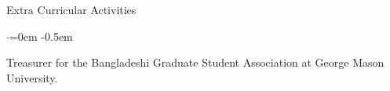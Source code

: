 \documentclass{resume} %
\renewenvironment{rSubsection}[4]{%
 {\bf #1} \hfill {#2}%
 \ifthenelse{\equal{#3}{}}{}{\\{\em #3} \hfill {\em #4}}\smallskip
 \begin{list}{$\cdot$}{\leftmargin=0em}%
  \itemsep -0.5em \vspace{-0.5em}%
 }{%
 \end{list}%
 \vspace{1pt}%
}
\begin{document}
\begin{rSection}{Extra Curricular Activities}
\begin{rSubsection}{}{}{}{}
\item Treasurer for the Bangladeshi Graduate Student Association at George Mason University.
\end{rSubsection}
\end{rSection}

\end{document}
